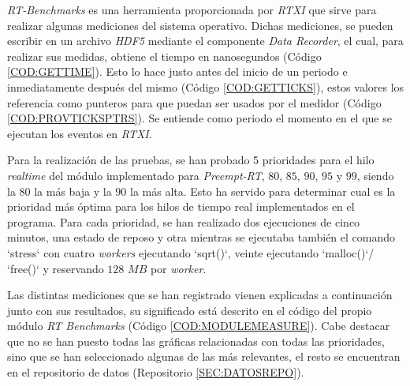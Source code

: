 \textit{RT-Benchmarks} es una herramienta proporcionada por \textit{RTXI} que sirve para realizar algunas mediciones del sistema operativo. Dichas mediciones, se pueden escribir en un archivo \textit{HDF5} mediante el componente \textit{Data Recorder}, el cual, para realizar sus medidas, obtiene el tiempo en nanosegundos (Código \ref{COD:GETTIME}). Esto lo hace justo antes del inicio de un periodo e inmediatamente después del mismo (Código \ref{COD:GETTICKS}), estos valores los referencia como punteros para que puedan ser usados por el medidor (Código \ref{COD:PROVTICKSPTRS}). Se entiende como periodo el momento en el que se ejecutan los eventos en \textit{RTXI}. 

Para la realización de las pruebas, se han probado 5 prioridades para el hilo \textit{realtime} del módulo implementado para \textit{Preempt-RT}, $80$, $85$, $90$, $95$ y $99$, siendo la $80$ la más baja y la $90$ la más alta. Esto ha servido para determinar cual es la prioridad más óptima para los hilos de tiempo real implementados en el programa. Para cada prioridad, se han realizado dos ejecuciones de cinco minutos, una estado de reposo y otra mientras se ejecutaba también el comando `stress` con cuatro \textit{workers} ejecutando `sqrt()`, veinte ejecutando `malloc()`/ `free()` y reservando $128$ $MB$ por \textit{worker}.

Las distintas mediciones que se han registrado vienen explicadas a continuación junto con sus resultados, su significado está descrito en el código del propio módulo \textit{RT Benchmarks} (Código \ref{COD:MODULEMEASURE}). Cabe destacar que no se han puesto todas las gráficas relacionadas con todas las prioridades, sino que se han seleccionado algunas de las más relevantes, el resto se encuentran en el repositorio de datos (Repositorio \ref{SEC:DATOSREPO}). 




